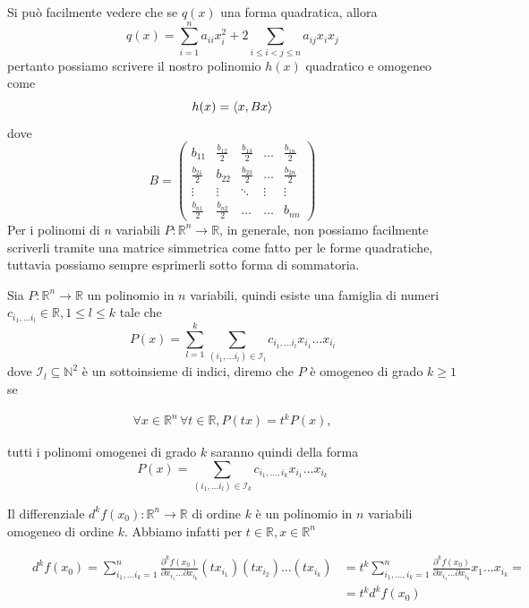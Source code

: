 Si può facilmente vedere che se $q(x)$ una forma quadratica, allora 
$$
q(x) = \sum_{i=1}^n a_{ii}x_i^2 + 2 \sum_{i \leq i < j \leq n} a_{ij} x_i x_j
$$
pertanto possiamo scrivere il nostro polinomio $h(x)$ quadratico e omogeneo come
$$
h(x) = \langle x, Bx \rangle
$$
dove
\begin{equation*}
B = \begin{pmatrix}
b_{11} & \frac{b_{12}}{2} & \frac{b_{13}}{2} & \ldots & \frac{b_{1n}}{2} \\
\frac{b_{21}}{2} & b_{22} & \frac{b_{23}}{2} & \ldots & \frac{b_{2n}}{2} \\
\vdots & \vdots & \ddots & \vdots & \vdots \\
\frac{b_{n1}}{2} & \frac{b_{n2}}{2} & \ldots & \ldots & b_{nn}
\end{pmatrix}
\end{equation*}
Per i polinomi di $n$ variabili $P: \mathbb{R}^n \to \mathbb{R}$, in generale, non possiamo facilmente scriverli tramite una matrice simmetrica come fatto per le forme quadratiche, tuttavia possiamo sempre esprimerli sotto forma di sommatoria.

\vspace{0.5cm}
\begin{definition}[\textcolor{blue}{polinomio di $n$ variabili omogeneo}]
Sia $P:\mathbb{R}^n \to \mathbb{R}$ un polinomio in $n$ variabili, quindi esiste una famiglia di numeri $c_{i_1, \ldots i_l} \in \mathbb{R}, 1 \leq l \leq k$ tale che
$$
P(x) = \sum_{l=1}^k \sum_{(i_1, \ldots i_l) \in \mathcal{I}_l} c_{i_1, \ldots i_l} x_{i_1} \ldots x_{i_l}
$$
dove $\mathcal{I}_l \subseteq \mathbb{N}^2$ è un sottoinsieme di indici, diremo che $P$ è omogeneo di grado $k \geq 1$ se

\[\begin{aligned}
\forall x \in \mathbb{R}^n \, \forall t \in \mathbb{R}, P(tx) = t^k P(x),
\end{aligned}\]

tutti i polinomi omogenei di grado $k$ saranno quindi della forma
$$
P(x) = \sum_{(i_1, \ldots i_l) \in \mathcal{I}_k} c_{i_1, \ldots, i_k} x_{i_1} \ldots x_{i_k}
$$
\end{definition}

Il differenziale $d^k f(x_0): \mathbb{R}^n \to \mathbb{R}$ di ordine $k$ è un polinomio in $n$ variabili omogeneo di ordine $k$. Abbiamo infatti per $t \in \mathbb{R}, x \in \mathbb{R}^n$

\[\begin{aligned}
& & d^k f(x_0) = \sum_{i_1, \ldots i_k = 1}^n \frac{\partial^k f(x_0)}{\partial x_{i_1} \ldots \partial x_{i_k}}(tx_{i_1})(tx_{i_2}) \ldots (tx_{i_k}) &= t^k \sum_{i_1, \ldots, i_k = 1}^n \frac{\partial^k f(x_0)}{\partial x_{i_1} \ldots \partial x_{i_k}} x_1 \ldots x_{i_k} = \\
& & &=t^k d^k f(x_0)
\end{aligned}\]

